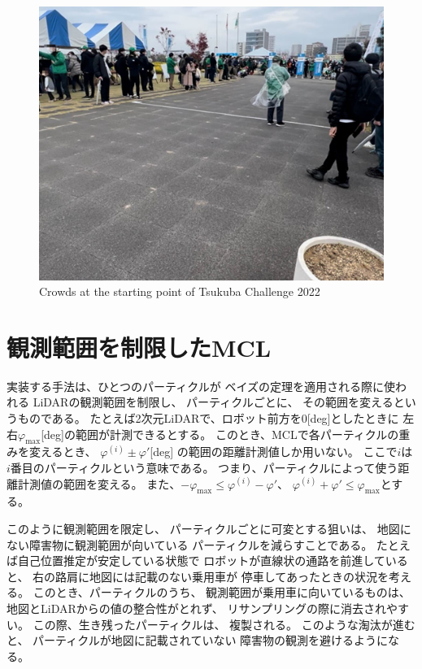 \documentclass{jarticle}
\begin{document}
\begin{figure}[bth]
  \centering
	\includegraphics[width=0.8\linewidth]{fig/hitogomi.png}
   \caption{Crowds at the starting point of Tsukuba Challenge 2022}
   \label{fig:つくばチャレンジ人混み}
 \end{figure}

\section{観測範囲を制限したMCL}%

実装する手法は、ひとつのパーティクルが
ベイズの定理を適用される際に使われる
LiDARの観測範囲を制限し、
パーティクルごとに、
その範囲を変えるというものである。
たとえば2次元LiDARで、ロボット前方を$0$[deg]としたときに
左右$\varphi_\text{max}$[deg]の範囲が計測できるとする。
このとき、MCLで各パーティクルの重みを変えるとき、
$\varphi^{(i)} \pm \varphi'$[deg]
の範囲の距離計測値しか用いない。
ここで$i$は$i$番目のパーティクルという意味である。
つまり、パーティクルによって使う距離計測値の範囲を変える。
また、$ -\varphi_\text{max} \le \varphi^{(i)}-\varphi'$、
$\varphi^{(i)}+\varphi' \le \varphi_\text{max}$とする。

このように観測範囲を限定し、
パーティクルごとに可変とする狙いは、
地図にない障害物に観測範囲が向いている
パーティクルを減らすことである。
たとえば自己位置推定が安定している状態で
ロボットが直線状の通路を前進していると、
右の路肩に地図には記載のない乗用車が
停車してあったときの状況を考える。
このとき、パーティクルのうち、
観測範囲が乗用車に向いているものは、
地図とLiDARからの値の整合性がとれず、
リサンプリングの際に消去されやすい。
この際、生き残ったパーティクルは、
複製される。
このような淘汰が進むと、
パーティクルが地図に記載されていない
障害物の観測を避けるようになる。
\end{document}
